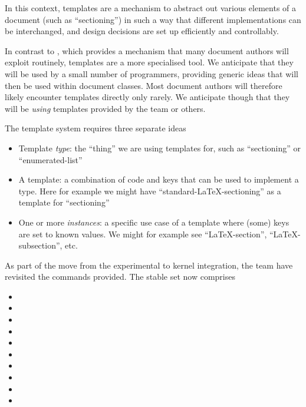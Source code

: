 \documentclass{ltnews}
\begin{document}
In this context, templates are a mechanism to abstract out various elements of a
document (such as \enquote{sectioning}) in such a way that different
implementations can be interchanged, and design decisions are set up efficiently
and controllably.

In contrast to , which provides a mechanism that many document
authors will exploit routinely, templates are a more specialised tool. We
anticipate that they will be used by a small number of programmers, providing
generic ideas that will then be used within document classes. Most document
authors will therefore likely encounter templates directly only rarely.
We anticipate though that they will be \emph{using} templates provided
by the team or others.

The template system requires three separate ideas
\begin{itemize}
  \item Template \emph{type}: the \enquote{thing} we are using templates
    for, such as \enquote{sectioning} or \enquote{enumerated-list}
  \item A template: a combination of code and keys that can be used
    to implement a type. Here for example we might have
    \enquote{standard-\LaTeX{}-sectioning} as a template for 
    \enquote{sectioning}
  \item One or more \emph{instances}: a specific use case of a template
    where (some) keys are set to known values. We might for example see
    \enquote{\LaTeX{}-section}, \enquote{\LaTeX{}-subsection}, etc.
\end{itemize}

As part of the move from the experimental  to kernel integration,
the team have revisited the commands provided. The stable set now comprises
\begin{itemize}
  \item {}
  \item {}
  \item {}
  \item {}
  \item {}
  \item {}
  \item {}
  \item {}
  \item {}
  \item {}
\end{itemize}
\end{document}
